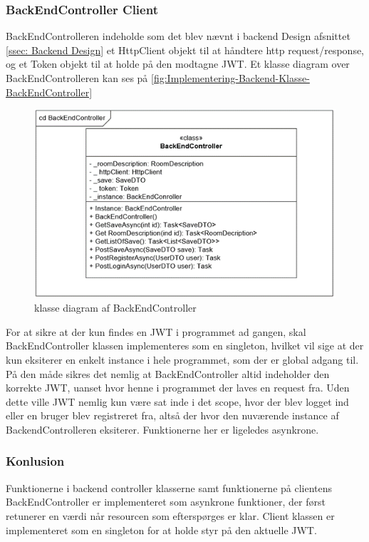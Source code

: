 \subsubsection{BackEndController Client}
BackEndControlleren indeholde som det blev nævnt i backend Design afsnittet \autoref{ssec: Backend Design} et HttpClient objekt til at håndtere http request/response, og et Token objekt til at holde på den modtagne JWT.
Et klasse diagram over BackEndControlleren kan ses på \autoref{fig:Implementering-Backend-Klasse-BackEndController}\\

\begin{figure}[H]
\centering
\includegraphics[width = \textwidth]{02-Body/Images/Backend_klasse_BackEndController.PNG}
\caption{klasse diagram af BackEndController}
\label{fig:Implementering-Backend-Klasse-BackEndController}
\end{figure}

For at sikre at der kun findes en JWT i programmet ad gangen, skal BackEndController klassen implementeres som en singleton, hvilket vil sige at der kun eksiterer en enkelt instance i hele programmet, som der er global adgang til. På den måde sikres det nemlig at BackEndController altid indeholder den korrekte JWT, uanset hvor henne i programmet der laves en request fra. Uden dette ville JWT nemlig kun være sat inde i det scope, hvor der blev logget ind eller en bruger blev registreret fra, altså der hvor den nuværende instance af BackendControlleren eksiterer. Funktionerne her er ligeledes asynkrone.\\


\subsubsection{Konlusion}

Funktionerne i backend controller klasserne samt funktionerne på clientens BackEndController er implementeret som asynkrone funktioner, der først retunerer en værdi når resourcen som efterspørges er klar. Client klassen er implementeret som en singleton for at holde styr på den aktuelle JWT.

\newpage
